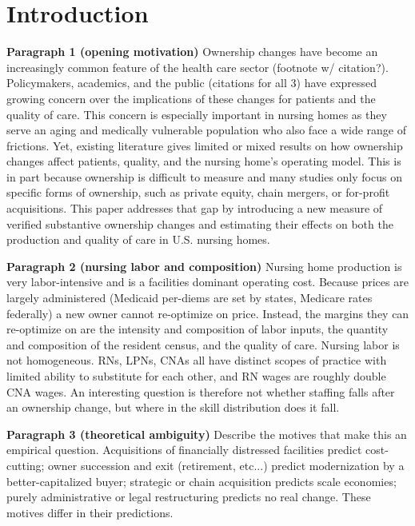 \documentclass[12pt]{article}
\begin{document}
\doublespacing

\section{Introduction} \label{sec:introduction}

\noindent\textbf{Paragraph 1 (opening motivation)} Ownership changes have become an increasingly common feature of the health care sector (footnote w/ citation?). Policymakers, academics, and the public (citations for all 3) have expressed growing concern over the implications of these changes for patients and the quality of care. This concern is especially important in nursing homes as they serve an aging and medically vulnerable population who also face a wide range of frictions. Yet, existing literature gives limited or mixed results on how ownership changes affect patients, quality, and the nursing home's operating model. This is in part because ownership is difficult to measure and many studies only focus on specific forms of ownership, such as private equity, chain mergers, or for-profit acquisitions. This paper addresses that gap by introducing a new measure of verified substantive ownership changes and estimating their effects on both the production and quality of care in U.S. nursing homes.

\medskip
\noindent\textbf{Paragraph 2 (nursing labor and composition)} Nursing home production is very labor-intensive and is a facilities dominant operating cost. Because prices are largely administered (Medicaid per-diems are set by states, Medicare rates federally) a new owner cannot re-optimize on price. Instead, the margins they can re-optimize on are the intensity and composition of labor inputs, the quantity and composition of the resident census, and the quality of care. Nursing labor is not homogeneous. RNs, LPNs, CNAs all have distinct scopes of practice with limited ability to substitute for each other, and RN wages are roughly double CNA wages. An interesting question is therefore not whether staffing falls after an ownership change, but where in the skill distribution does it fall.

\medskip
\noindent\textbf{Paragraph 3 (theoretical ambiguity)} Describe the motives that make this an empirical question.
Acquisitions of financially distressed facilities predict cost-cutting; owner succession and exit (retirement, etc...) predict modernization by a better-capitalized buyer; strategic or chain acquisition predicts scale economies; purely administrative or legal restructuring predicts no real change. These motives differ in their predictions. 
\end{document}
